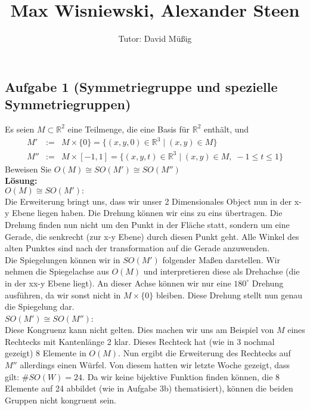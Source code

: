 \documentclass[11pt,a4paper,ngerman]{article}
\author{Tutor: David Müßig}
\date{}
\title{Max Wisniewski, Alexander Steen}
\newcommand{\R}{\mathbb{R}}
\begin{document}

\maketitle
\thispagestyle{fancy}


\subsection*{Aufgabe 1 \mdseries (Symmetriegruppe und spezielle Symmetriegruppen)}

Es seien $M \subset \mathbb{R}^2$ eine Teilmenge, die eine Basis für $\mathbb{R}^2$ enthält, und
$$
\begin{array}{rcl}
M' & := & M \times \{ 0 \} = \{ (x,y,0) \in \R^3 \; | \; (x,y) \in M \}\\
M'' & := & M \times [-1 , 1] = \{ (x,y,t) \in \R^3 \; | \; (x,y) \in M, \; -1 \leq t \leq 1 \}
\end{array}
$$
Beweisen Sie $O(M) \cong SO(M') \cong SO(M'')$\\

\textbf{Lösung:}\\

$O(M) \cong SO(M'):$\\
Die Erweiterung bringt uns, dass wir unser 2 Dimensionales Object nun in der x-y Ebene liegen haben. Die Drehung können wir eins zu eins übertragen. Die Drehung finden nun nicht um den Punkt in der Fläche statt, sondern um eine Gerade, die senkrecht (zur x-y Ebene) durch diesen Punkt geht. Alle Winkel des alten Punktes sind nach der transformation auf die Gerade anzuwenden.\\

Die Spiegelungen können wir in $SO(M')$ folgender Maßen darstellen. Wir nehmen die Spiegelachse aus $O(M)$ und interpretieren diese als Drehachse (die in der xx-y Ebene liegt). An dieser Achse können wir nur eine $180^\circ$ Drehung ausführen, da wir sonst nicht in $M\times\{ 0 \}$ bleiben. Diese Drehung stellt nun genau die Spiegelung dar.\\

$SO(M') \cong SO(M'')$:\\
Diese Kongruenz kann nicht gelten. Dies machen wir uns am Beispiel von $M$ eines Rechtecks mit Kantenlänge 2 klar. Dieses Rechteck hat (wie in 3 nochmal gezeigt) 8 Elemente in $O(M)$. Nun ergibt die Erweiterung des Rechtecks auf $M''$ allerdings einen Würfel. Von diesem hatten wir letzte Woche gezeigt, dass gilt: $\# SO ( W) = 24$. Da wir keine bijektive Funktion finden können, die 8 Elemente auf 24 abbildet (wie in Aufgabe 3b) thematisiert), können die beiden Gruppen nicht kongruent sein.
\end{document}
